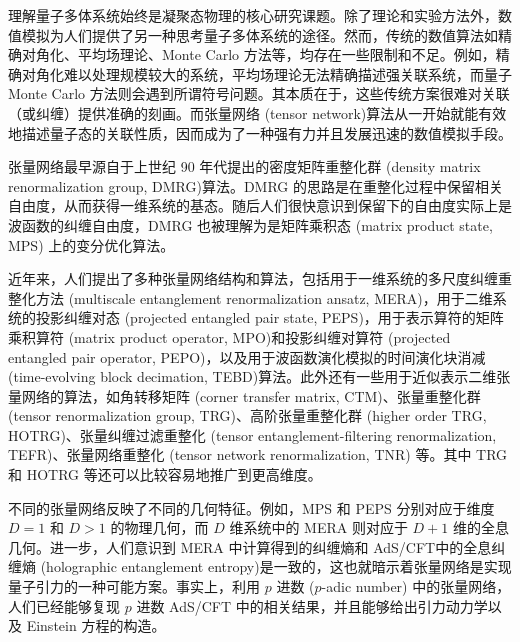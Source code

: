 理解量子多体系统始终是凝聚态物理的核心研究课题。除了理论和实验方法外，数值模拟为人们提供了另一种思考量子多体系统的途径。然而，传统的数值算法如精确对角化、平均场理论、Monte Carlo 方法等，均存在一些限制和不足。例如，精确对角化难以处理规模较大的系统，平均场理论无法精确描述强关联系统，而量子 Monte Carlo 方法则会遇到所谓符号问题。其本质在于，这些传统方案很难对关联（或纠缠）提供准确的刻画。而张量网络 (tensor network)\cite{orus2014practical,bridgeman2017hand,biamonte2017tensor,orus2019tensor,ran2020tensor,evenbly2022practical}算法从一开始就能有效地描述量子态的关联性质，因而成为了一种强有力并且发展迅速的数值模拟手段。

张量网络最早源自于上世纪 90 年代提出的密度矩阵重整化群 (density matrix renormalization group, DMRG)\cite{white1992density,white1993density,schollwock2005density}算法。DMRG 的思路是在重整化过程中保留相关自由度，从而获得一维系统的基态。随后人们很快意识到保留下的自由度实际上是波函数的纠缠自由度，DMRG 也被理解为是矩阵乘积态 (matrix product state, MPS) 上的变分优化算法\cite{mcculloch2007density,perez2007matrix,verstraete2008matrix,schollwock2011density}。

近年来，人们提出了多种张量网络结构和算法，包括用于一维系统的多尺度纠缠重整化方法 (multiscale entanglement renormalization ansatz, MERA)\cite{vidal2007entanglement,evenbly2009algorithms,evenbly2014algorithms}，用于二维系统的投影纠缠对态 (projected entangled pair state, PEPS)\cite{verstraete2004renormalization}，用于表示算符的矩阵乘积算符 (matrix product operator, MPO)\cite{pirvu2010matrix}和投影纠缠对算符 (projected entangled pair operator, PEPO)\cite{czarnik2015variational}，以及用于波函数演化模拟的时间演化块消减 (time-evolving block decimation, TEBD)\cite{vidal2003efficient,vidal2004efficient,vidal2007classical,orus2008infinite}算法。此外还有一些用于近似表示二维张量网络的算法，如角转移矩阵 (corner transfer matrix, CTM)\cite{nishino1996corner,orus2012exploring}、张量重整化群 (tensor renormalization group, TRG)\cite{levin2007tensor}、高阶张量重整化群 (higher order TRG, HOTRG)\cite{xie2012coarse}、张量纠缠过滤重整化 (tensor entanglement-filtering renormalization, TEFR)\cite{gu2009tensor1}、张量网络重整化 (tensor network renormalization, TNR)\cite{evenbly2015tensor1,evenbly2017algorithms} 等。其中 TRG 和 HOTRG 等还可以比较容易地推广到更高维度。

不同的张量网络反映了不同的几何特征。例如，MPS 和 PEPS 分别对应于维度 $D=1$ 和 $D>1$ 的物理几何，而 $D$ 维系统中的 MERA 则对应于 $D+1$ 维的全息几何\cite{evenbly2011tensor}。进一步，人们意识到 MERA 中计算得到的纠缠熵和 AdS/CFT\cite{maldacena1999large}中的全息纠缠熵 (holographic entanglement entropy)\cite{ryu2006holographic}是一致的\cite{swingle2012entanglement,swingle2012constructing}，这也就暗示着张量网络是实现量子引力的一种可能方案。事实上，利用 $p$ 进数 ($p$-adic number) 中的张量网络，人们已经能够复现 $p$ 进数 AdS/CFT 中的相关结果\cite{bhattacharyya2018tensor,hung2019padic}，并且能够给出引力动力学以及 Einstein 方程的构造\cite{chen2021emergent}。


